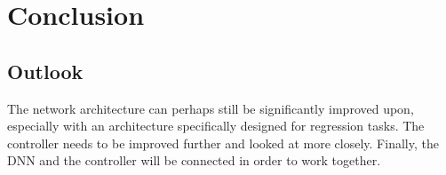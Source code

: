 \documentclass[10pt,a4paper,twoside,journal]{IEEEtran}
\begin{document}
\section{Conclusion}
\label{sc:conclusion}

\subsection{Outlook}
\label{ssc:outlook}
The network architecture can perhaps still be significantly improved upon, especially with an architecture specifically designed for regression tasks. 
The controller needs to be improved further and looked at more closely. Finally, the DNN and the controller will be connected in order to work together.




\end{document}
